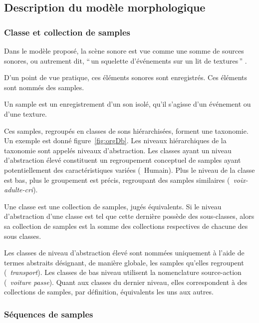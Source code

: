 \subsection{Description du modèle morphologique}
\label{sec:ch4_modelDes}

\subsubsection{Classe et collection de samples}
\label{sec:ch4_collecSons}

Dans le modèle proposé, la scène sonore est vue comme une somme de sources sonores, ou autrement dit, ``\,un squelette d'événements sur un lit de textures\,'' \citep{nelken2013ear}. 

D'un point de vue pratique, ces éléments sonores sont enregistrés. Ces éléments sont nommés des samples.
 
\begin{mydef}
Un sample est un enregistrement d'un son isolé, qu'il s'agisse d'un événement ou d'une texture.
\end{mydef}


Ces samples, regroupés en classes de sons hiérarchisées, forment une taxonomie. Un exemple est donné figure~\ref{fig:orgDb}. Les niveaux hiérarchiques de la taxonomie sont appelés niveaux d'abstraction. Les classes ayant un niveau d'abstraction élevé constituent un regroupement conceptuel de samples ayant potentiellement des caractéristiques variées (\eg~{Humain}). Plus le niveau de la classe est bas, plus le groupement  est précis, regroupant des samples similaires (\eg~\emph{voix-adulte-cri}). 

\begin{mydef}
Une classe est une collection de samples, jugés équivalents. Si le niveau d'abstraction d'une classe est tel que cette dernière possède des sous-classes, alors sa collection de samples est la somme des collections respectives de chacune des sous classes.
\end{mydef}

Les classes de niveau d'abstraction élevé sont nommées uniquement à l'aide de termes abstraits désignant, de manière globale, les samples qu'elles regroupent (\eg~\emph{transport}). Les classes de bas niveau utilisent la nomenclature source-action (\eg~\emph{voiture passe}). Quant aux classes du dernier niveau, elles correspondent à des collections de samples, par définition, équivalents les uns aux autres.

\subsubsection{Séquences de samples}
\label{sec:ch4_seqSample}

